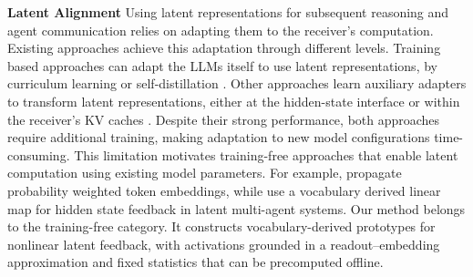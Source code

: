 \documentclass[11pt]{article}
\begin{document}
\noindent\textbf{Latent Alignment} Using latent representations for subsequent reasoning and agent communication relies on adapting them to the receiver's computation. Existing approaches achieve this adaptation through different levels. Training based approaches can adapt the LLMs itself to use latent representations, by curriculum learning \citep{coconut} or self-distillation \citep{shen-etal-2025-codi}. Other approaches learn auxiliary adapters to transform latent representations, either at the hidden-state interface \citep{softcot,interlat} or within the receiver's KV caches \citep{c2c,cache_alignment,latent_cache_flow}. Despite their strong performance, both approaches require additional training, making adaptation to new model configurations time-consuming. This limitation motivates training-free approaches that enable latent computation using existing model parameters. For example, \citet{pham2024let,soft_thinking} propagate probability weighted token embeddings, while \citet{latentmas} use a vocabulary derived linear map for hidden state feedback in latent multi-agent systems. Our method belongs to the training-free category. 
It constructs vocabulary-derived prototypes for nonlinear latent feedback, with activations grounded in a readout--embedding approximation and fixed statistics that can be precomputed offline.

\end{document}
